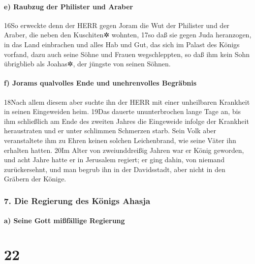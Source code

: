 \hypertarget{e-raubzug-der-philister-und-araber}{%
\paragraph{e) Raubzug der Philister und
Araber}\label{e-raubzug-der-philister-und-araber}}

16So erweckte denn der HERR gegen Joram die Wut der Philister und der
Araber, die neben den Kuschiten✲ wohnten, 17so daß sie gegen Juda
heranzogen, in das Land einbrachen und alles Hab und Gut, das sich im
Palast des Königs vorfand, dazu auch seine Söhne und Frauen
wegschleppten, so daß ihm kein Sohn übrigblieb als Joahas✲, der jüngste
von seinen Söhnen.

\hypertarget{f-jorams-qualvolles-ende-und-unehrenvolles-begruxe4bnis}{%
\paragraph{f) Jorams qualvolles Ende und unehrenvolles
Begräbnis}\label{f-jorams-qualvolles-ende-und-unehrenvolles-begruxe4bnis}}

18Nach allem diesem aber suchte ihn der HERR mit einer unheilbaren
Krankheit in seinen Eingeweiden heim. 19Das dauerte ununterbrochen lange
Tage an, bis ihm schließlich am Ende des zweiten Jahres die Eingeweide
infolge der Krankheit heraustraten und er unter schlimmen Schmerzen
starb. Sein Volk aber veranstaltete ihm zu Ehren keinen solchen
Leichenbrand, wie seine Väter ihn erhalten hatten. 20Im Alter von
zweiunddreißig Jahren war er König geworden, und acht Jahre hatte er in
Jerusalem regiert; er ging dahin, von niemand zurückersehnt, und man
begrub ihn in der Davidsstadt, aber nicht in den Gräbern der Könige.

\hypertarget{die-regierung-des-kuxf6nigs-ahasja}{%
\subsubsection{7. Die Regierung des Königs
Ahasja}\label{die-regierung-des-kuxf6nigs-ahasja}}

\hypertarget{a-seine-gott-miuxdffuxe4llige-regierung}{%
\paragraph{a) Seine Gott mißfällige
Regierung}\label{a-seine-gott-miuxdffuxe4llige-regierung}}

\hypertarget{section-21}{%
\section{22}\label{section-21}}

